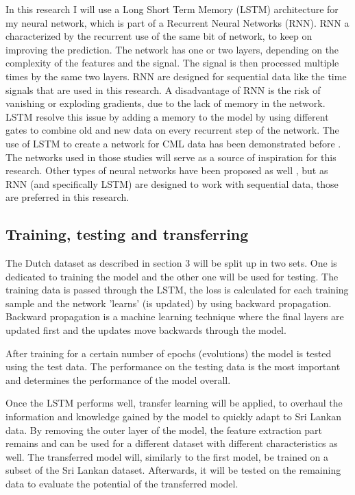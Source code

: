 \documentclass[twocolumn, 10pt, a4paper]{article}
\begin{document}
	In this research I will use a Long Short Term Memory (LSTM) architecture for my neural network, which is part of a Recurrent Neural Networks (RNN). RNN a characterized by the recurrent use of the same bit of network, to keep on improving the prediction. The network has one or two layers, depending on the complexity of the features and the signal. The signal is then processed multiple times by the same two layers. RNN are designed for sequential data like the time signals that are used in this research. A disadvantage of RNN is the risk of vanishing or exploding gradients, due to the lack of memory in the network. LSTM resolve this issue by adding a memory to the model by using different gates to combine old and new data on every recurrent step of the network. The use of LSTM to create a network for CML data has been demonstrated before \cite{Habi2019, Diba2021, Pudashine2020}. The networks used in those studies will serve as a source of inspiration for this research. Other types of neural networks have been proposed as well \cite{Polz2020}, but as RNN (and specifically LSTM) are designed to work with sequential data, those are preferred in this research.
	
	\subsection{Training, testing and transferring}
	The  Dutch dataset as described in section 3 will be split up in two sets. One is dedicated to training the model and the other one will be used for testing. The training data is passed through the LSTM, the loss is calculated for each training sample and the network 'learns' (is updated) by using backward propagation. Backward propagation is a machine learning technique where the final layers are updated first and the updates move backwards through the model. 
	
	After training for a certain number of epochs (evolutions) the model is tested using the test data. The performance on the testing data is the most important and determines the performance of the model overall. 
	
	Once the LSTM performs well, transfer learning will be applied, to overhaul the information and knowledge gained by the model to quickly adapt to Sri Lankan data. By removing the outer layer of the model, the feature extraction part remains and can be used for a different dataset with different characteristics as well. The transferred model will, similarly to the first model, be trained on a subset of the Sri Lankan dataset. Afterwards, it will be tested on the remaining data to evaluate the potential of the transferred model. 
	
\end{document}
